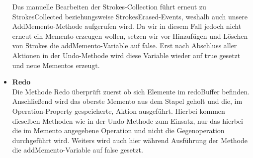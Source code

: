 \begin{itemize}
Das manuelle Bearbeiten der Strokes-Collection führt erneut zu StrokesCollected beziehungsweise StrokesErased-Events, weshalb auch unsere AddMemento-Methode aufgerufen wird. Da wir in diesem Fall jedoch nicht erneut ein Memento erzeugen wollen, setzen wir vor Hinzufügen und Löschen von Strokes die addMemento-Variable auf false. Erst nach Abschluss aller Aktionen in der Undo-Methode wird diese Variable wieder auf true gesetzt und neue Mementos erzeugt. 
\item \textbf{Redo}\\
Die Methode Redo überprüft zuerst ob sich Elemente im redoBuffer befinden. Anschließend wird das oberste Memento aus dem Stapel geholt und die, im Operation-Property gespeicherte, Aktion ausgeführt. Hierbei kommen dieselben Methoden wie in der Undo-Methode zum Einsatz, nur das hierbei die im Memento angegebene Operation und nicht die Gegenoperation durchgeführt wird. Weiters wird auch hier während Ausführung der Methode die addMemento-Variable auf false gesetzt.
\end{itemize}

